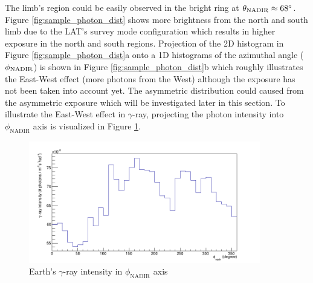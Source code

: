 The limb's region could be easily observed in the bright ring
at $\theta_{\rm NADIR}\approx68^\circ$.
Figure \ref{fig:sample_photon_dist} shows more
brightness from the north and south limb
due to the LAT's survey mode configuration which results in
higher exposure in the north and south regions.
Projection of the 2D histogram in
Figure \ref{fig:sample_photon_dist}a onto a 1D histograms
of the azimuthal angle ($\phi_{\rm NADIR}$) is shown in Figure
\ref{fig:sample_photon_dist}b which roughly
illustrates the East-West effect
(more photons from the West) although the exposure has not
been taken into account yet. The asymmetric distribution
could caused from the asymmetric exposure which will be 
investigated later in this section.
To illustrate the East-West effect in $\gamma$-ray,
projecting the photon intensity into $\phi_\text{NADIR}$ axis is 
visualized in Figure \ref{fig:flx_phi}.



\begin{figure}[h!]
    \centering
    \includegraphics[width=0.9\textwidth]{content/result_and_discussion/figures/zoom_rs/flx_phi_nadir_hist.png}
    \caption{Earth's $\gamma$-ray intensity in $\phi_\text{NADIR}$ axis}
    \label{fig:flx_phi}
\end{figure}



